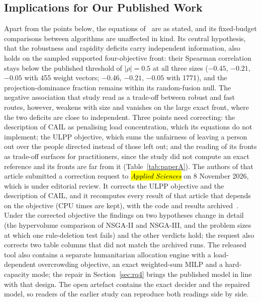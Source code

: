 \documentclass[systems,article,accept,moreauthors,pdftex]{Definitions/mdpi}
\begin{document}
\subsection{Implications for Our Published Work}\label{sec:implications}
Apart from the points below, the equations of~\cite{rabiei2026resilient} are as stated, and its
fixed-budget comparisons between algorithms are unaffected in kind. Its central hypothesis,
that the robustness and rapidity deficits carry independent information, also holds on the
sampled supported four-objective front: their Spearman correlation stays below the published
threshold of $|\rho| = 0.5$ at all three sizes ($-0.45$, $-0.21$, $-0.05$ with 455 weight
vectors; $-0.46$, $-0.21$, $-0.05$ with 1771), and the projection-dominance fraction remains
within its random-fusion null. The negative association that study read as a trade-off
between robust and fast routes, however, weakens with size and vanishes on the large exact
front, where the \linebreak  two deficits are close to independent. Three points need correcting: the
description of CAIL as penalising load concentration, which its equations do not implement; the
ULPP objective, which sums the unfairness of leaving a person out over the people directed
instead of those left out; and the
reading of its fronts as trade-off surfaces for practitioners, since the study did not compute an
exact reference and its fronts are far from it (Table~\ref{tab:paperA}). The authors of that
article submitted a correction request to \emph{\hl{Applied Sciences}%
} on 8 November 2026, which is
under editorial review. It corrects the ULPP objective and the description of CAIL, and it
recomputes every result of that article that depends on the objective (CPU times are kept), with
the code and results archived~\cite{rabiei2026correctionarchive}. Under the corrected objective
the findings on two hypotheses change in detail (the hypervolume comparison of NSGA-II and
NSGA-III, and the problem sizes at which one rule-deletion test fails) and the other verdicts
hold; the request also corrects two table
columns that did not match the archived runs. The released tool also contains a separate humanitarian allocation
engine with a load-dependent overcrowding objective, an exact weighted-sum MILP and a
hard-capacity mode; the repair in Section~\ref{sec:rq4} brings the published model in line with
that design. The open artefact contains the exact decider and the repaired model, so readers of
the earlier study can reproduce both readings side by side.
\end{document}
